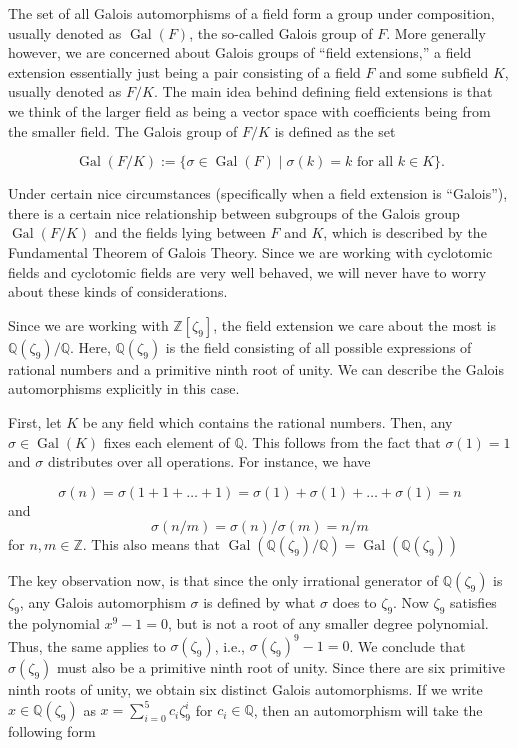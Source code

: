 \documentclass[12pt]{amsart}
\theoremstyle{definition}
\newcommand{\Z}{\mathbb{Z}}
\newcommand{\Q}{\mathbb{Q}}
\DeclareMathOperator{\Gal}{Gal} %
\newcommand{\Zn}{\mathbb{Z}[\zeta_9]}
\begin{document}
	The set of all Galois automorphisms of a field form a group under composition, usually denoted as $\Gal(F)$, the so-called Galois group of $F$. More generally however, we are concerned about Galois groups of ``field extensions,'' a field extension essentially just being a pair consisting of a field $F$ and some subfield $K$, usually denoted as $F/K$. The main idea behind defining field extensions is that we think of the larger field as being a vector space with coefficients being from the smaller field. The Galois group of $F/K$ is defined as the set
	
	$$\Gal(F/K) := \{\sigma \in \Gal(F)\; | \; \sigma(k) = k \mbox{ for all } k \in K\}.$$  
	
	Under certain nice circumstances (specifically when a field extension is ``Galois''), there is a certain nice relationship between subgroups of the Galois group $\Gal(F/K)$ and the fields lying between $F$ and $K$, which is described by the Fundamental Theorem of Galois Theory. Since we are working with cyclotomic fields and cyclotomic fields are very well behaved, we will never have to worry about these kinds of considerations.
	
	Since we are working with $\Zn$, the field extension we care about the most is $\Q(\zeta_9)/\Q$. Here, $\Q(\zeta_9)$ is the field consisting of all possible expressions of rational numbers and a primitive ninth root of unity. We can describe the Galois automorphisms explicitly in this case.
	
	First, let $K$ be any field which contains the rational numbers. Then, any $\sigma \in \Gal(K)$ fixes each element of $\Q$. This follows from the fact that $\sigma(1) = 1$ and $\sigma$ distributes over all operations. For instance, we have
	
	$$
	\sigma(n) = \sigma(1 + 1 + \ldots + 1) = \sigma(1) + \sigma(1) + \ldots + \sigma(1) = n
	$$ and
	$$
	\sigma(n/m) = \sigma(n)/\sigma(m) = n/m
	$$
	for $n,m \in \Z$. This also means that $\Gal(\Q(\zeta_9)/\Q) = \Gal(\Q(\zeta_9))$
	
	The key observation now, is that since the only irrational generator of $\Q(\zeta_9)$ is $\zeta_9$, any Galois automorphism $\sigma$ is defined by what $\sigma$ does to $\zeta_9$. Now $\zeta_9$ satisfies the polynomial $x^9 - 1 = 0$, but is not a root of any smaller degree polynomial. Thus, the same applies to $\sigma(\zeta_9)$, i.e., $\sigma(\zeta_9)^9 - 1 = 0$. We conclude that $\sigma(\zeta_9)$ must also be a primitive ninth root of unity. Since there are six primitive ninth roots of unity, we obtain six distinct Galois automorphisms. If we write $x \in \Q(\zeta_9)$ as $x = \sum_{i=0}^5 c_i \zeta_9^i$ for $c_i \in \Q$, then an automorphism will take the following form
	
\end{document}
